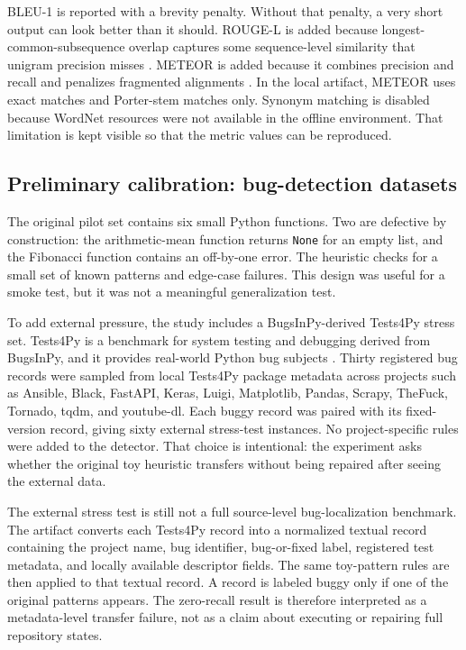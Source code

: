 \documentclass[preprint,12pt]{elsarticle}
\begin{document}
BLEU-1 is reported with a brevity penalty. Without that penalty, a very short output can look better than it should. ROUGE-L is added because longest-common-subsequence overlap captures some sequence-level similarity that unigram precision misses \cite{lin2004rouge}. METEOR is added because it combines precision and recall and penalizes fragmented alignments \cite{lavie2007meteor}. In the local artifact, METEOR uses exact matches and Porter-stem matches only. Synonym matching is disabled because WordNet resources were not available in the offline environment. That limitation is kept visible so that the metric values can be reproduced.

\subsection{Preliminary calibration: bug-detection datasets}

The original pilot set contains six small Python functions. Two are defective by construction: the arithmetic-mean function returns \texttt{None} for an empty list, and the Fibonacci function contains an off-by-one error. The heuristic checks for a small set of known patterns and edge-case failures. This design was useful for a smoke test, but it was not a meaningful generalization test.

To add external pressure, the study includes a BugsInPy-derived Tests4Py stress set. Tests4Py is a benchmark for system testing and debugging derived from BugsInPy, and it provides real-world Python bug subjects \cite{smytzek2023tests4py}. Thirty registered bug records were sampled from local Tests4Py package metadata across projects such as Ansible, Black, FastAPI, Keras, Luigi, Matplotlib, Pandas, Scrapy, TheFuck, Tornado, tqdm, and youtube-dl. Each buggy record was paired with its fixed-version record, giving sixty external stress-test instances. No project-specific rules were added to the detector. That choice is intentional: the experiment asks whether the original toy heuristic transfers without being repaired after seeing the external data.

The external stress test is still not a full source-level bug-localization benchmark. The artifact converts each Tests4Py record into a normalized textual record containing the project name, bug identifier, bug-or-fixed label, registered test metadata, and locally available descriptor fields. The same toy-pattern rules are then applied to that textual record. A record is labeled buggy only if one of the original patterns appears. The zero-recall result is therefore interpreted as a metadata-level transfer failure, not as a claim about executing or repairing full repository states.
\end{document}
